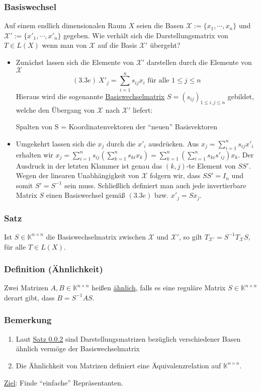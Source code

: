 \subsubsection{Basiswechsel}
Auf einem endlich dimensionalen Raum $X$ seien die Basen $\mathcal{X}:=\{x_1,\cdots ,x_n\}$ und $\mathcal{X}':=\{x'_1,\cdots ,x'_n\}$ gegeben.  Wie verhält sich die Darstellungsmatrix von $T\in L(X)$ wenn man von $\mathcal{X}$ auf die Basis $\mathcal{X}'$ übergeht?
\begin{itemize}
\item Zunächst lassen sich die Elemente von $\mathcal{X}'$ darstellen durch die Elemente von $\mathcal{X}$
\[(3.3e)\ X'_j=\sum _{i=1}^ns_{ij}x_i\text{ für alle } 1\leq j\leq n\]
Hieraus wird die sogenannte \underline{Basiswechselmatrix} $S=(s_{ij})_{1\leq i,j\leq n}$ gebildet, welche den Übergang von $\mathcal{X}$ nach $\mathcal{X}'$ liefert:
\begin{center}
Spalten von S = Koordinatenvektoren der "`neuen"' Basisvektoren
\end{center}
\item Umgekehrt lassen sich die $x_j$ durch die $x'_i$ ausdrücken.  Aus $x_j=\sum _{i=1}^ns_{ij}x'_i$ erhalten wir $x_j=\sum _{i=1}^ns_{ij}(\sum _{k=1}^n s_{ki}x_k)=\sum _{k=1}^n(\sum _{i=1}^n s_{ki}s'_{ij})x_k$. Der Ausdruck in der letzten Klammer ist genau das $(k,j)$-te Element von $SS'$.  Wegen der linearen Unabhängigkeit von $\mathcal{X}$ folgern wir, dass $SS'=I_n$ und somit $S'=S^{-1}$ sein muss.  Schließlich definiert man auch jede invertierbare Matrix $S$ einen Basiswechsel gemäß $(3.3e)$ bzw. $x'_j=Sx_j$.
\end{itemize}
\addtocounter{subsubsection}{12}
\subsubsection{Satz}
\label{3.3.16}
Ist $S\in \mathbb{K}^{n\times n}$ die Basiswechselmatrix zwischen $\mathcal{X}$ und $\mathcal{X}'$, so gilt $T_{\mathcal{X}'}=S^{-1}T_\mathcal{X}S$, für alle $T\in L(X)$.
\subsubsection{Definition (Ähnlichkeit)}
Zwei Matrizen $A,B\in \mathbb{K}^{n\times n}$ heißen \underline{ähnlich}, falls es eine reguläre Matrix $S\in\mathbb{K}^{n\times n}$ derart gibt, dass $B=S^{-1}AS$.
\subsubsection{Bemerkung}
\begin{enumerate}
\renewcommand{\labelenumi}{(\arabic{enumi})}
\item Laut \hyperref[3.3.16]{Satz \ref*{3.3.16}} sind Darstellungsmatrizen bezüglich verschiedener Basen ähnlich vermöge der Basiswechselmatrix
\item Die Ähnlichkeit von Matrizen definiert eine Äquivalenzrelation auf $\mathbb{K}^{n\times n}$.
\end{enumerate}
\underline{Ziel}: Finde "`einfache"' Repräsentanten.